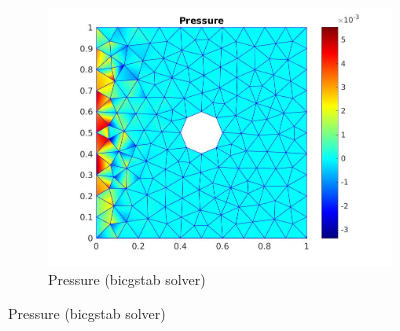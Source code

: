 \documentclass[a4paper]{book}
\begin{document}
\begin{figure}[H]
\begin{subfigure}{\textwidth}
  \includegraphics[width=\linewidth]{cylinder_bicgstab_pressure.jpg}
  \caption{Pressure (bicgstab solver)}
  \label{pressure_stoke_bicgstab}
\end{subfigure}
\label{flow_over_cylinder_bicgstab}
\end{figure}
\end{document}
